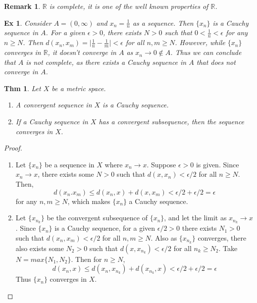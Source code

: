 \documentclass[paper=a4, fontsize=11pt]{scrartcl}
\newtheorem{theorem}{Thm}
\newtheorem{example}{Ex}
\newtheorem*{remark}{Remark}
\begin{document}
\begin{remark}
	$\mathbb{R}$ is complete, it is one of the well known properties of  $\mathbb{R}$.
\end{remark}

\begin{example}
	Consider $A=(0,\infty)$ and $x_n = \frac{1}{n}$ as a sequence. Then $\{x_n\}$ is a Cauchy sequence in $A$. For a given $\epsilon >0$, there exists $N>0$ such that $0<\frac{1}{n}<\epsilon$ for any $n\geq N$. Then $d(x_n, x_m) = \big|\frac{1}{n}-\frac{1}{m}\big| < \epsilon$ for all $n,m \geq N$. However, while $\{x_n\}$ converges in $\mathbb{R}$, it doesn't converge in $A$ as $x_n \to 0 \notin A$. Thus we can conclude that $A$ is not complete, as there exists a Cauchy sequence in $A$ that does not converge in $A$.\\
\end{example}

\begin{theorem}
Let $X$ be a metric space.
\begin{enumerate}
	\item A convergent sequence in $X$ is a Cauchy sequence.
	\item If a Cauchy sequence in $X$ has a convergent subsequence, then the sequence converges in $X$.\\
\end{enumerate}	
\end{theorem}

\begin{proof}
$ $ \newline
\vspace{-0.15in}
\begin{enumerate}
	\item Let $\{x_n\}$ be a sequence in $X$ where $x_n \to x$. Suppose $\epsilon >0$ is given. Since $x_n \to x$, there exists some $N>0$ such that $d(x,x_n)<\epsilon/2$ for all $n \geq N$. Then,
	\begin{equation}\nonumber
		d(x_n.x_m) \leq d(x_n,x) + d(x,x_m) < \epsilon/2 + \epsilon/2 = \epsilon
	\end{equation}
	for any $n,m \geq N$, which makes $\{x_n\}$ a Cauchy sequence.
	\item Let $\{x_{n_k}\}$ be the convergent subsequence of $\{x_n\}$, and let the limit as $x_{n_k} \to x$. Since $\{x_n\}$ is a Cauchy sequence, for a given $\epsilon/2 >0$ there exists $N_1>0$ such that $d(x_n,x_m)<\epsilon/2$ for all $n,m \geq N$. Also as $\{x_{n_k}\}$ converges, there also exists some $N_2>0$ such that $d(x,x_{n_k})<\epsilon/2$ for all $n_k \geq N_2$. Take $N=max\{N_1,N_2\}$. Then for $n\geq N$,
	\begin{equation}\nonumber
		d(x_n,x) \leq d(x_n,x_{n_k}) + d(x_{n_k},x) < \epsilon/2 + \epsilon/2 = \epsilon
	\end{equation}
	Thus $\{x_n\}$ converges in $X$.
\end{enumerate}
\end{proof}
\end{document}
